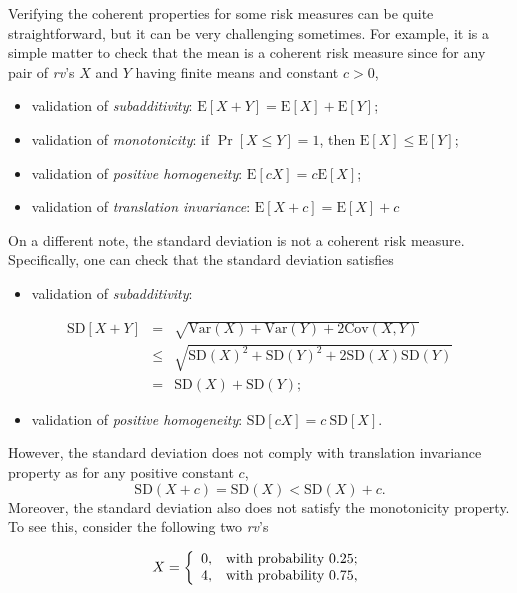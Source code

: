 \documentclass[]{book}
\providecommand{\tightlist}{%
  \setlength{\itemsep}{0pt}\setlength{\parskip}{0pt}}
\theoremstyle{definition}
\theoremstyle{definition}
\theoremstyle{definition}
\theoremstyle{remark}
\begin{document}
Verifying the coherent properties for some risk measures can be quite
straightforward, but it can be very challenging sometimes. For example,
it is a simple matter to check that the mean is a coherent risk measure
since for any pair of \emph{rv}'s \(X\) and \(Y\) having finite means
and constant \(c>0\),

\begin{itemize}
\tightlist
\item
  validation of \emph{subadditivity}:
  \(\mathrm{E}[X+Y]=\mathrm{E}[X]+\mathrm{E}[Y]\);
\item
  validation of \emph{monotonicity}: if \(\Pr[X\leq Y]=1\), then
  \(\mathrm{E}[X]\leq \mathrm{E}[Y]\);
\item
  validation of \emph{positive homogeneity}:
  \(\mathrm{E}[cX]=c\mathrm{E}[X]\);
\item
  validation of \emph{translation invariance}:
  \(\mathrm{E}[X+c]=\mathrm{E}[X]+c\)
\end{itemize}

On a different note, the standard deviation is not a coherent risk
measure. Specifically, one can check that the standard deviation
satisfies

\begin{itemize}
\tightlist
\item
  validation of \emph{subadditivity}:
\end{itemize}

\begin{eqnarray*} 
\mathrm{SD}[X+Y]&=&\sqrt{\mathrm{Var}(X)+\mathrm{Var}(Y)+2\mathrm{Cov}(X,Y)}\\
      &\leq& \sqrt{\mathrm{SD}(X)^2+\mathrm{SD}(Y)^2+2\mathrm{SD}(X)\mathrm{SD}(Y)}\\
      &=& \mathrm{SD}(X)+\mathrm{SD}(Y);
\end{eqnarray*}

\begin{itemize}
\tightlist
\item
  validation of \emph{positive homogeneity}:
  \(\mathrm{SD}[cX]=c~\mathrm{SD}[X]\).
\end{itemize}

However, the standard deviation does not comply with translation
invariance property as for any positive constant \(c\), \[
\mathrm{SD}(X+c)=\mathrm{SD}(X)<\mathrm{SD}(X)+c.
\] Moreover, the standard deviation also does not satisfy the
monotonicity property. To see this, consider the following two
\emph{rv}'s

\begin{eqnarray}
X=\left\{
    \begin{array}{ll}
      0, & \hbox{with probability $0.25$;} \\
      4, & \hbox{with probability $0.75$,}
    \end{array}
  \right.
\label{eq:special-x}
\end{eqnarray}
\end{document}
